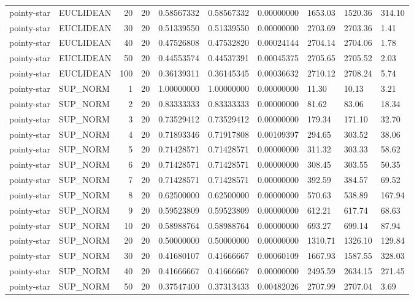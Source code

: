 \begin{longtable}{llrrllllll}
pointy-star & EUCLIDEAN & 20 & 20 & 0.58567332 & 0.58567332 & 0.00000000 & 1653.03 & 1520.36 & 314.10 \\
pointy-star & EUCLIDEAN & 30 & 20 & 0.51339550 & 0.51339550 & 0.00000000 & 2703.69 & 2703.36 & 1.41 \\
pointy-star & EUCLIDEAN & 40 & 20 & 0.47526808 & 0.47532820 & 0.00024144 & 2704.14 & 2704.06 & 1.78 \\
pointy-star & EUCLIDEAN & 50 & 20 & 0.44553574 & 0.44537391 & 0.00045375 & 2705.65 & 2705.52 & 2.03 \\
pointy-star & EUCLIDEAN & 100 & 20 & 0.36139311 & 0.36145345 & 0.00036632 & 2710.12 & 2708.24 & 5.74 \\
pointy-star & SUP\_NORM & 1 & 20 & 1.00000000 & 1.00000000 & 0.00000000 & 11.30 & 10.13 & 3.21 \\
pointy-star & SUP\_NORM & 2 & 20 & 0.83333333 & 0.83333333 & 0.00000000 & 81.62 & 83.06 & 18.34 \\
pointy-star & SUP\_NORM & 3 & 20 & 0.73529412 & 0.73529412 & 0.00000000 & 179.34 & 171.10 & 32.70 \\
pointy-star & SUP\_NORM & 4 & 20 & 0.71893346 & 0.71917808 & 0.00109397 & 294.65 & 303.52 & 38.06 \\
pointy-star & SUP\_NORM & 5 & 20 & 0.71428571 & 0.71428571 & 0.00000000 & 311.32 & 303.33 & 58.62 \\
pointy-star & SUP\_NORM & 6 & 20 & 0.71428571 & 0.71428571 & 0.00000000 & 308.45 & 303.55 & 50.35 \\
pointy-star & SUP\_NORM & 7 & 20 & 0.71428571 & 0.71428571 & 0.00000000 & 392.59 & 384.57 & 69.52 \\
pointy-star & SUP\_NORM & 8 & 20 & 0.62500000 & 0.62500000 & 0.00000000 & 570.63 & 538.89 & 167.94 \\
pointy-star & SUP\_NORM & 9 & 20 & 0.59523809 & 0.59523809 & 0.00000000 & 612.21 & 617.74 & 68.63 \\
pointy-star & SUP\_NORM & 10 & 20 & 0.58988764 & 0.58988764 & 0.00000000 & 693.27 & 699.14 & 87.94 \\
pointy-star & SUP\_NORM & 20 & 20 & 0.50000000 & 0.50000000 & 0.00000000 & 1310.71 & 1326.10 & 129.84 \\
pointy-star & SUP\_NORM & 30 & 20 & 0.41680107 & 0.41666667 & 0.00060109 & 1667.93 & 1587.55 & 328.03 \\
pointy-star & SUP\_NORM & 40 & 20 & 0.41666667 & 0.41666667 & 0.00000000 & 2495.59 & 2634.15 & 271.45 \\
pointy-star & SUP\_NORM & 50 & 20 & 0.37547400 & 0.37313433 & 0.00482026 & 2707.99 & 2707.04 & 3.69 \\

\end{longtable}
